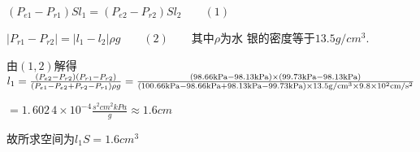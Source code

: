 \documentclass{ctexart}
\begin{document}
$\left( P_{e1}-P_{r1}\right) Sl_{1}=\left( P_{e2}-P_{r2}\right) Sl_{2}\qquad
\left( 1\right) $

$\left\vert P_{r1}-P_{r2}\right\vert =\left\vert l_{1}-l_{2}\right\vert \rho
g\qquad \left( 2\right) \qquad $其中$\rho $为水%
银的密度等于$13.5\unit{g}/\unit{cm}^{3}.$

由$\left( 1,2\right) $解得\qquad $l_{1}=\frac{\left(
P_{e2}-P_{r2}\right) \left( P_{r1}-P_{r2}\right) }{\left(
P_{e1}-P_{e2}+P_{r2}-P_{r1}\right) \rho g}=\frac{\left( 98.66\unit{kPa}-98.13%
\unit{kPa}\right) \times \left( 99.73\unit{kPa}-98.13\unit{kPa}\right) }{%
\left( 100.66\unit{kPa}-98.66\unit{kPa}+98.13\unit{kPa}-99.73\unit{kPa}%
\right) \times 13.5\unit{g}/\unit{cm}^{3}\times 9.8\times 10^{2}\unit{cm}/%
\unit{s}^{2}}$

$=\allowbreak 1.\,\allowbreak 602\,4\times 10^{-4}\frac{\unit{s}^{2}\unit{cm}%
^{2}\unit{kPa}\allowbreak }{\unit{g}}\approx 1.6\unit{cm}$

故所求空间为\qquad $l_{1}S=1.6\unit{cm}%
^{3}$
\end{document}
